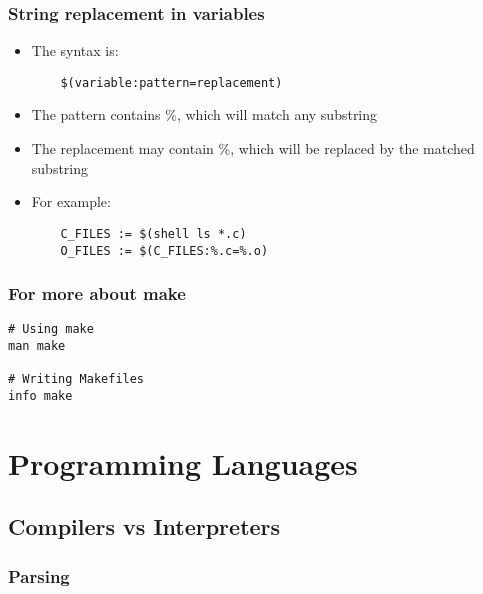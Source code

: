 \documentclass[12pt]{article}
\begin{document}
\subsubsection{String replacement in variables}

\begin{itemize}
  \item The syntax is:
  \begin{lstlisting}
    $(variable:pattern=replacement)
  \end{lstlisting}

  \item The pattern contains \%, which will match any substring
  \item The replacement may contain \%, which will be replaced by the matched substring
  \item For example:
  \begin{lstlisting}
    C_FILES := $(shell ls *.c)
    O_FILES := $(C_FILES:%.c=%.o)
  \end{lstlisting}
\end{itemize}

\subsubsection{For more about make}

\begin{lstlisting}
# Using make
man make

# Writing Makefiles
info make
\end{lstlisting}





















\newpage
\section{Programming Languages}

\subsection{Compilers vs Interpreters}
\subsubsection{Parsing}
\end{document}
